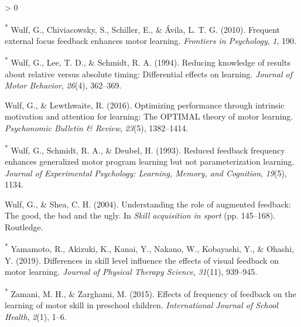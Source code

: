 \documentclass[
  english,
  man, donotrepeattitle,mask,floatsintext]{apa7}
\newlength{\cslhangindent}
\newenvironment{CSLReferences}[2] %
 {%
  \setlength{\parindent}{0pt}
  \ifodd #1 \everypar{\setlength{\hangindent}{\cslhangindent}}\ignorespaces\fi
  \ifnum #2 > 0
  \setlength{\parskip}{#2\baselineskip}
  \fi
 }%
 {}
\begin{document}
\begin{CSLReferences}{1}{0}
\leavevmode\hypertarget{ref-Wulf2010}{}%
\textsuperscript{*} Wulf, G., Chiviacowsky, S., Schiller, E., \& Ávila, L. T. G. (2010). Frequent external focus feedback enhances motor learning. \emph{Frontiers in Psychology}, \emph{1}, 190.

\leavevmode\hypertarget{ref-Wulf1994}{}%
\textsuperscript{*} Wulf, G., Lee, T. D., \& Schmidt, R. A. (1994). Reducing knowledge of results about relative versus absolute timing: Differential effects on learning. \emph{Journal of Motor Behavior}, \emph{26}(4), 362--369.

\leavevmode\hypertarget{ref-Wulf2016}{}%
Wulf, G., \& Lewthwaite, R. (2016). Optimizing performance through intrinsic motivation and attention for learning: The OPTIMAL theory of motor learning. \emph{Psychonomic Bulletin \& Review}, \emph{23}(5), 1382--1414.

\leavevmode\hypertarget{ref-Wulf1993}{}%
\textsuperscript{*} Wulf, G., Schmidt, R. A., \& Deubel, H. (1993). Reduced feedback frequency enhances generalized motor program learning but not parameterization learning. \emph{Journal of Experimental Psychology: Learning, Memory, and Cognition}, \emph{19}(5), 1134.

\leavevmode\hypertarget{ref-Wulf2004}{}%
Wulf, G., \& Shea, C. H. (2004). Understanding the role of augmented feedback: The good, the bad and the ugly. In \emph{Skill acquisition in sport} (pp. 145--168). Routledge.

\leavevmode\hypertarget{ref-Yamamoto2019}{}%
\textsuperscript{*} Yamamoto, R., Akizuki, K., Kanai, Y., Nakano, W., Kobayashi, Y., \& Ohashi, Y. (2019). Differences in skill level influence the effects of visual feedback on motor learning. \emph{Journal of Physical Therapy Science}, \emph{31}(11), 939--945.

\leavevmode\hypertarget{ref-Zamani2015}{}%
\textsuperscript{*} Zamani, M. H., \& Zarghami, M. (2015). Effects of frequency of feedback on the learning of motor skill in preschool children. \emph{International Journal of School Health}, \emph{2}(1), 1--6.

\end{CSLReferences}
\end{document}
